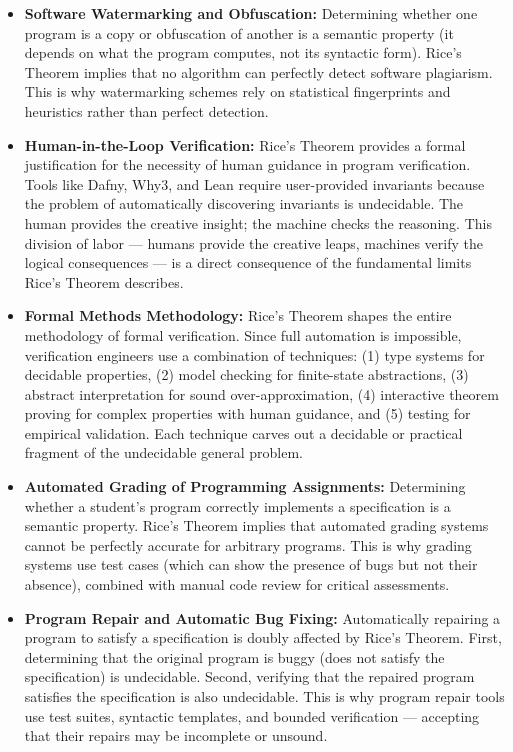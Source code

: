 \begin{itemize}
\item \textbf{Software Watermarking and Obfuscation:} Determining whether one program is a copy or obfuscation of another is a semantic property (it depends on what the program computes, not its syntactic form). Rice's Theorem implies that no algorithm can perfectly detect software plagiarism. This is why watermarking schemes rely on statistical fingerprints and heuristics rather than perfect detection.

\item \textbf{Human-in-the-Loop Verification:} Rice's Theorem provides a formal justification for the necessity of human guidance in program verification. Tools like Dafny, Why3, and Lean require user-provided invariants because the problem of automatically discovering invariants is undecidable. The human provides the creative insight; the machine checks the reasoning. This division of labor --- humans provide the creative leaps, machines verify the logical consequences --- is a direct consequence of the fundamental limits Rice's Theorem describes.

\item \textbf{Formal Methods Methodology:} Rice's Theorem shapes the entire methodology of formal verification. Since full automation is impossible, verification engineers use a combination of techniques: (1) type systems for decidable properties, (2) model checking for finite-state abstractions, (3) abstract interpretation for sound over-approximation, (4) interactive theorem proving for complex properties with human guidance, and (5) testing for empirical validation. Each technique carves out a decidable or practical fragment of the undecidable general problem.

\item \textbf{Automated Grading of Programming Assignments:} Determining whether a student's program correctly implements a specification is a semantic property. Rice's Theorem implies that automated grading systems cannot be perfectly accurate for arbitrary programs. This is why grading systems use test cases (which can show the presence of bugs but not their absence), combined with manual code review for critical assessments.

\item \textbf{Program Repair and Automatic Bug Fixing:} Automatically repairing a program to satisfy a specification is doubly affected by Rice's Theorem. First, determining that the original program is buggy (does not satisfy the specification) is undecidable. Second, verifying that the repaired program satisfies the specification is also undecidable. This is why program repair tools use test suites, syntactic templates, and bounded verification --- accepting that their repairs may be incomplete or unsound.
\end{itemize}

